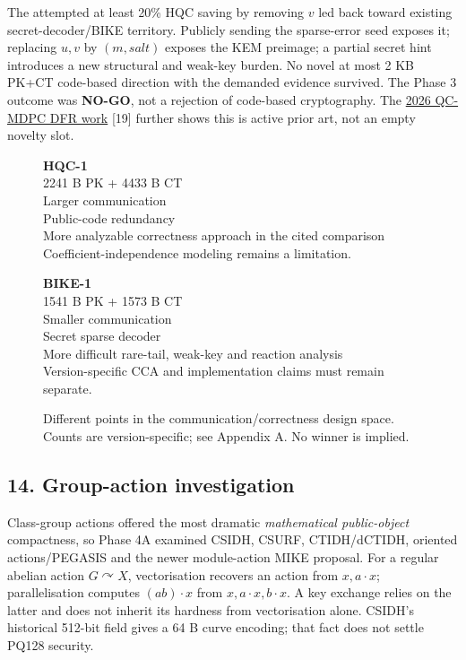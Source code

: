 \documentclass[
  10pt,
  a4paper,
]{article}
\begin{document}
The attempted at least 20\% HQC saving by removing \(v\) led back toward
existing secret-decoder/BIKE territory. Publicly sending the
sparse-error seed exposes it; replacing \(u,v\) by \((m,salt)\) exposes
the KEM preimage; a partial secret hint introduces a new structural and
weak-key burden. No novel at most 2 KB PK+CT code-based direction with
the demanded evidence survived. The Phase 3 outcome was \textbf{NO-GO},
not a rejection of code-based cryptography. The
\href{https://eprint.iacr.org/2025/1043}{2026 QC-MDPC DFR work} {[}19{]}
further shows this is active prior art, not an empty novelty slot.

\begin{figure}[htbp]
\centering
\begin{minipage}[t]{.46\linewidth}
\textsf{\large\textbf{HQC-1}}\\[9pt]
2241 B PK + 4433 B CT\\[9pt]
Larger communication\\Public-code redundancy\\More analyzable correctness approach in the cited comparison\\[9pt]
Coefficient-independence modeling remains a limitation.
\end{minipage}\hfill
\begin{minipage}[t]{.46\linewidth}
\textsf{\large\textbf{BIKE-1}}\\[9pt]
1541 B PK + 1573 B CT\\[9pt]
Smaller communication\\Secret sparse decoder\\More difficult rare-tail, weak-key and reaction analysis\\[9pt]
Version-specific CCA and implementation claims must remain separate.
\end{minipage}
\caption{Different points in the communication/correctness design space. Counts are version-specific; see Appendix A. No winner is implied.}\label{fig:hqc}
\end{figure}

\hypertarget{group-action-investigation}{%
\subsection{14. Group-action
investigation}\label{group-action-investigation}}

Class-group actions offered the most dramatic \emph{mathematical
public-object} compactness, so Phase 4A examined CSIDH, CSURF,
CTIDH/dCTIDH, oriented actions/PEGASIS and the newer module-action MIKE
proposal. For a regular abelian action \(G\curvearrowright X\),
vectorisation recovers an action from \(x,a\cdot x\); parallelisation
computes \((ab)\cdot x\) from \(x,a\cdot x,b\cdot x\). A key exchange
relies on the latter and does not inherit its hardness from
vectorisation alone. CSIDH's historical 512-bit field gives a 64 B curve
encoding; that fact does not settle PQ128 security.
\end{document}
